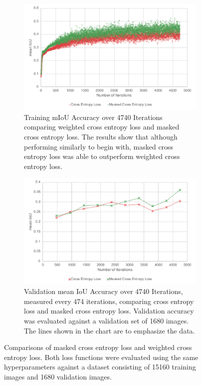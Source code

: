 \begin{figure}
	\centering
	\begin{subfigure}{\textwidth}
		\includegraphics[width=\textwidth]{figures/experiments/loss-comparison-training.pdf}
		\caption[Loss Comparison Chart: Training]{Training mIoU Accuracy over 4740 Iterations comparing weighted cross entropy loss and masked cross entropy loss. The results show that although performing similarly to begin with, masked cross entropy loss was able to outperform weighted cross entropy loss.}
		\label{chart:experiments-losstraining}
	\end{subfigure}
	\newline
	\begin{subfigure}{\textwidth}
		\includegraphics[width=\textwidth]{figures/experiments/loss-comparison-validation.pdf}
		\caption[Loss Comparison Chart: Validation]{Validation mean IoU Accuracy over 4740 Iterations, measured every 474 iterations, comparing cross entropy loss and masked cross entropy loss. Validation accuracy was evaluated against a validation set of 1680 images. The lines shown in the chart are to emphasize the data.}
		\label{chart:experiments-lossvalidation}
	\end{subfigure}
	\caption[Loss Comparison Chart]{Comparisons of masked cross entropy loss and weighted cross entropy loss. Both loss functions were evaluated using the same hyperparameters against a dataset consisting of 15160 training images and 1680 validation images.}
\end{figure}